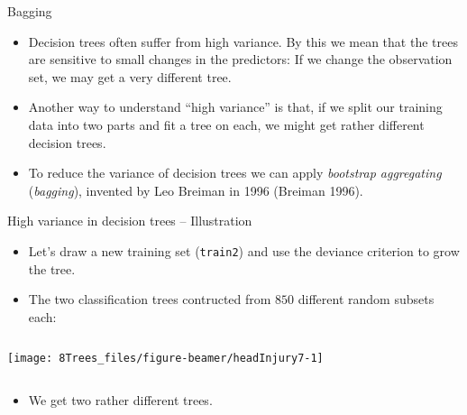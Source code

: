 \documentclass[
  10pt,
  ignorenonframetext,
]{beamer}
\providecommand{\tightlist}{%
  \setlength{\itemsep}{0pt}\setlength{\parskip}{0pt}}
\begin{document}
\begin{frame}{Bagging}
\protect\hypertarget{bagging}{}
\vspace{2mm}

\begin{itemize}
\item
  Decision trees often suffer from high variance. By this we mean that
  the trees are sensitive to small changes in the predictors: If we
  change the observation set, we may get a very different tree.
\item
  Another way to understand ``high variance'' is that, if we split our
  training data into two parts and fit a tree on each, we might get
  rather different decision trees.
\end{itemize}

\begin{itemize}
\tightlist
\item
  To reduce the variance of decision trees we can apply \emph{bootstrap
  aggregating} (\emph{bagging}), invented by Leo Breiman in 1996
  (Breiman 1996).
\end{itemize}
\end{frame}

\begin{frame}[fragile]
\begin{block}{High variance in decision trees -- Illustration}
\protect\hypertarget{high-variance-in-decision-trees-illustration}{}
\(~\)

\begin{itemize}
\item
  Let's draw a new training set (\texttt{train2}) and use the deviance
  criterion to grow the tree.
\item
  The two classification trees contructed from \(850\) different random
  subsets each:
\end{itemize}

\(~\)

\begin{center}\texttt{[image: 8Trees\_files/figure-beamer/headInjury7-1]} \end{center}

\(~\)

\begin{itemize}
\tightlist
\item
  We get two rather different trees.
\end{itemize}

\vspace{2mm}
\end{block}
\end{frame}
\end{document}
